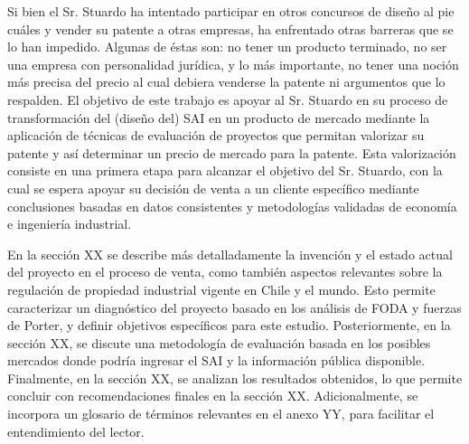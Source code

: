 Si bien el Sr. Stuardo ha intentado participar en otros concursos de diseño al pie cuáles y vender su patente a otras empresas, ha enfrentado otras barreras que se lo han impedido. Algunas de éstas son: no tener un producto terminado, no ser una empresa con personalidad jurídica, y lo más importante, no tener una noción más precisa del precio al cual debiera venderse la patente ni argumentos que lo respalden. El objetivo de este trabajo es apoyar al Sr. Stuardo en su proceso de transformación del (diseño del) SAI en un producto de mercado mediante la aplicación de técnicas de evaluación de proyectos que permitan valorizar su patente y así determinar un precio de mercado para la patente. Esta valorización consiste en una primera etapa para alcanzar el objetivo del Sr. Stuardo, con la cual se espera apoyar su decisión de venta a un cliente específico mediante conclusiones basadas en datos consistentes y metodologías validadas de economía e ingeniería industrial.

En la sección XX se describe más detalladamente la invención y el estado actual del proyecto en el proceso de venta, como también aspectos relevantes sobre la regulación de propiedad industrial vigente en Chile y el mundo. Esto permite caracterizar un diagnóstico del proyecto basado en los análisis de FODA y fuerzas de Porter, y definir objetivos específicos para este estudio. Posteriormente, en la sección XX, se discute una metodología de evaluación basada en los posibles mercados donde podría ingresar el SAI y la información pública disponible. Finalmente, en la sección XX, se analizan los resultados obtenidos, lo que permite concluir con recomendaciones finales en la sección XX. Adicionalmente, se incorpora un glosario de términos relevantes en el anexo YY, para facilitar el entendimiento del lector.
